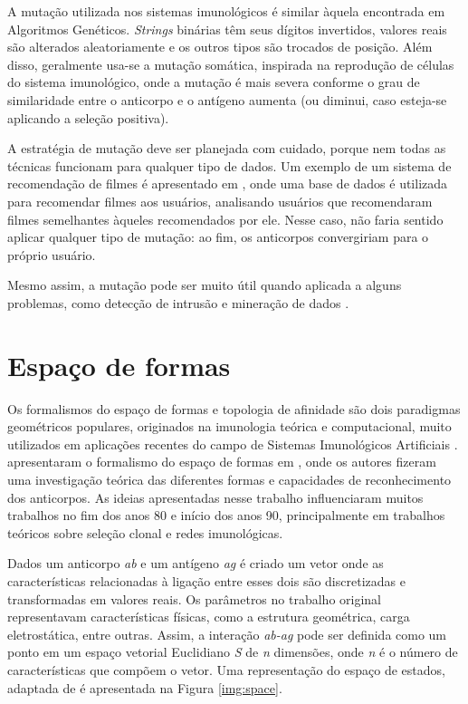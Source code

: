 A mutação utilizada nos sistemas imunológicos é similar àquela encontrada em Algoritmos Genéticos. \emph{Strings} binárias têm seus dígitos invertidos, valores reais são alterados aleatoriamente e os outros tipos são trocados de posição. Além disso, geralmente usa-se a mutação somática, inspirada na reprodução de células do sistema imunológico, onde a mutação é mais severa conforme o grau de similaridade entre o anticorpo e o antígeno aumenta (ou diminui, caso esteja-se aplicando a seleção positiva). 

A estratégia de mutação deve ser planejada com cuidado, porque nem todas as técnicas funcionam para qualquer tipo de dados. Um exemplo de um sistema de recomendação de filmes é apresentado em \citet{Aickelin2005}, onde uma base de dados é utilizada para recomendar filmes aos usuários, analisando usuários que recomendaram filmes semelhantes àqueles recomendados por ele. Nesse caso, não faria sentido aplicar qualquer tipo de mutação: ao fim, os anticorpos convergiriam para o próprio usuário.

Mesmo assim, a mutação pode ser muito útil quando aplicada a alguns problemas, como detecção de intrusão e mineração de dados \cite{DeCastro2002}. 

\section{Espaço de formas}
\label{sec:ais_shape}

Os formalismos do espaço de formas e topologia de afinidade são dois paradigmas geométricos populares, originados na imunologia teórica e computacional, muito utilizados em aplicações recentes do campo de Sistemas Imunológicos Artificiais \cite{Brownlee2007}. \citeauthor{Perelson1979} apresentaram o formalismo do espaço de formas em \citet{Perelson1979}, onde os autores fizeram uma investigação teórica das diferentes formas e capacidades de reconhecimento dos anticorpos. As ideias apresentadas nesse trabalho influenciaram muitos trabalhos no fim dos anos 80 e início dos anos 90, principalmente em trabalhos teóricos sobre seleção clonal e redes imunológicas.

Dados um anticorpo \emph{ab} e um antígeno \emph{ag} é criado um vetor onde as características relacionadas à ligação entre esses dois são discretizadas e transformadas em valores reais. Os parâmetros no trabalho original representavam características físicas, como a estrutura geométrica, carga eletrostática, entre outras. Assim, a interação \emph{ab-ag} pode ser definida como um ponto em um espaço vetorial Euclidiano \emph{S} de \emph{n} dimensões, onde \emph{n} é o número de características que compõem o vetor. Uma representação do espaço de estados, adaptada de \citet{Brownlee2007} é apresentada na Figura \ref{img:space}.

